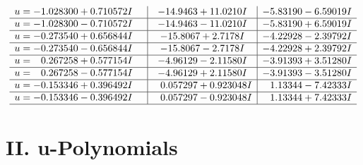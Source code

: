 \documentclass[1p]{elsarticle_modified}
\theoremstyle{definition}
\begin{document}
$$\begin{array}{c|c|c}
\begin{aligned}
u &= -1.028300 + 0.710572 I\end{aligned}
 & -14.9463 + 11.0210 I & -5.83190 - 6.59019 I \\ \hline\begin{aligned}
u &= -1.028300 - 0.710572 I\end{aligned}
 & -14.9463 - 11.0210 I & -5.83190 + 6.59019 I \\ \hline\begin{aligned}
u &= -0.273540 + 0.656844 I\end{aligned}
 & -15.8067 + 2.7178 I & -4.22928 - 2.39792 I \\ \hline\begin{aligned}
u &= -0.273540 - 0.656844 I\end{aligned}
 & -15.8067 - 2.7178 I & -4.22928 + 2.39792 I \\ \hline\begin{aligned}
u &= \phantom{-}0.267258 + 0.577154 I\end{aligned}
 & -4.96129 - 2.11580 I & -3.91393 + 3.51280 I \\ \hline\begin{aligned}
u &= \phantom{-}0.267258 - 0.577154 I\end{aligned}
 & -4.96129 + 2.11580 I & -3.91393 - 3.51280 I \\ \hline\begin{aligned}
u &= -0.153346 + 0.396492 I\end{aligned}
 & \phantom{-}0.057297 + 0.923048 I & \phantom{-}1.13344 - 7.42333 I \\ \hline\begin{aligned}
u &= -0.153346 - 0.396492 I\end{aligned}
 & \phantom{-}0.057297 - 0.923048 I & \phantom{-}1.13344 + 7.42333 I\\
 \hline 
 \end{array}$$\newpage
\newpage\renewcommand{\arraystretch}{1}
\centering \section*{ II. u-Polynomials}
\end{document}

